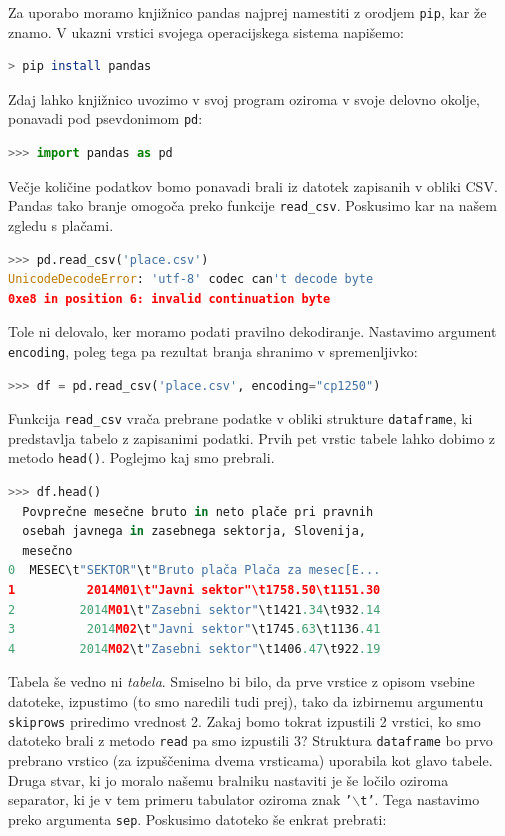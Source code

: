 Za uporabo moramo knjižnico pandas najprej namestiti z orodjem \texttt{pip}, kar že znamo. V ukazni vrstici svojega operacijskega sistema napišemo:
\begin{lstlisting}[language=bash]
> pip install pandas
\end{lstlisting}
Zdaj lahko knjižnico uvozimo v svoj program oziroma v svoje delovno okolje, ponavadi pod psevdonimom \texttt{pd}:
\begin{lstlisting}[language=python]
>>> import pandas as pd
\end{lstlisting}
Večje količine podatkov bomo ponavadi brali iz datotek zapisanih v obliki CSV. Pandas tako branje omogoča preko funkcije \texttt{read\_csv}. Poskusimo kar na našem zgledu s plačami.
\begin{lstlisting}[language=python]
>>> pd.read_csv('place.csv')
UnicodeDecodeError: 'utf-8' codec can't decode byte
0xe8 in position 6: invalid continuation byte
\end{lstlisting}
Tole ni delovalo, ker moramo podati pravilno dekodiranje. Nastavimo argument \texttt{encoding}, poleg tega pa rezultat branja shranimo v spremenljivko:
\begin{lstlisting}[language=python]
>>> df = pd.read_csv('place.csv', encoding="cp1250")
\end{lstlisting}
Funkcija \texttt{read\_csv} vrača prebrane podatke v obliki strukture \texttt{dataframe}, ki predstavlja tabelo z zapisanimi podatki. Prvih pet vrstic tabele lahko dobimo z metodo \texttt{head()}. Poglejmo kaj smo prebrali.
\begin{lstlisting}[language=python]
>>> df.head()
  Povprečne mesečne bruto in neto plače pri pravnih
  osebah javnega in zasebnega sektorja, Slovenija,
  mesečno
0  MESEC\t"SEKTOR"\t"Bruto plača Plača za mesec[E...                                                        
1          2014M01\t"Javni sektor"\t1758.50\t1151.30                                                        
2         2014M01\t"Zasebni sektor"\t1421.34\t932.14                                                        
3          2014M02\t"Javni sektor"\t1745.63\t1136.41                                                        
4         2014M02\t"Zasebni sektor"\t1406.47\t922.19  
\end{lstlisting}
Tabela še vedno ni \emph{tabela}. Smiselno bi bilo, da prve vrstice z opisom vsebine datoteke, izpustimo (to smo naredili tudi prej), tako da izbirnemu argumentu \texttt{skiprows} priredimo vrednost 2. Zakaj bomo tokrat izpustili 2 vrstici, ko smo datoteko brali z metodo \texttt{read} pa smo izpustili 3? Struktura \texttt{dataframe} bo prvo prebrano vrstico (za izpuščenima dvema vrsticama) uporabila kot glavo tabele. Druga stvar, ki jo moralo našemu bralniku nastaviti je še ločilo oziroma separator, ki je v tem primeru tabulator oziroma znak \texttt{'$\backslash$t'}. Tega nastavimo preko argumenta \texttt{sep}. Poskusimo datoteko še enkrat prebrati:
